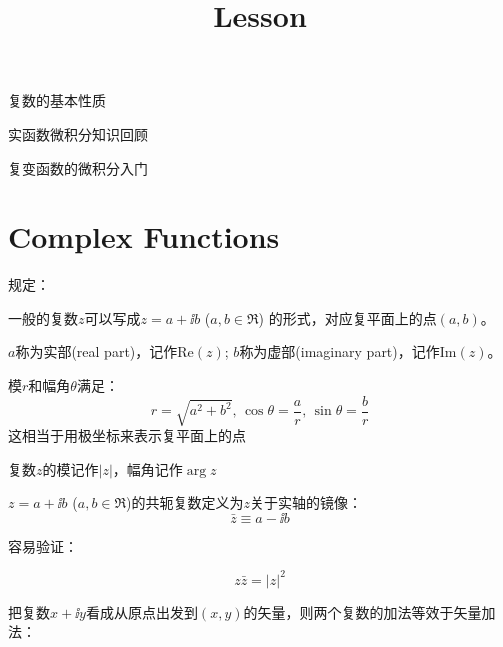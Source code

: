 \documentclass[CJK]{beamer}
\title{Lesson }
\author{}
\date{}
\begin{document}


\begin{frame}
\bch
\bitem
\item{复数的基本性质}
\item{实函数微积分知识回顾}
\item{复变函数的微积分入门}
\eitem
\ech
\end{frame}

\section{Complex Functions}



\begin{frame}
\bch
规定：

一般的复数$z$可以写成$z=a +  \ii b $ ($a, b\in \Re$) 的形式，对应复平面上的点$(a, b)$。

$a$称为实部(real part)，记作$\mathrm{Re}(z)$; $b$称为虚部(imaginary part)，记作$\mathrm{Im}(z)$。

\emini
{}
\emini
\ech
\end{frame}



\begin{frame}
\bch
{}

模$r$和幅角$\theta$满足：
$$ r = \sqrt{a^2+b^2},\, \cos\theta = \frac{a}{r},\, \sin\theta = \frac{b}{r}$$
这相当于用极坐标来表示复平面上的点

\skipline

复数$z$的模记作$|z|$，幅角记作$\arg z$
\emini
{}
\emini

\ech
\end{frame}


\begin{frame}
\bch


$z = a+\ii b$ ($a, b\in \Re$)的共轭复数定义为$z$关于实轴的镜像：
$$\bar{z} \equiv a - \ii b$$

容易验证：

$$z\bar{z} = |z|^2$$
\emini
{}
\emini
\ech
\end{frame}

\begin{frame}
\bch
把复数$x+\ii y$看成从原点出发到$(x, y)$的矢量，则两个复数的加法等效于矢量加法：

\ech
\end{frame}
\end{document}
